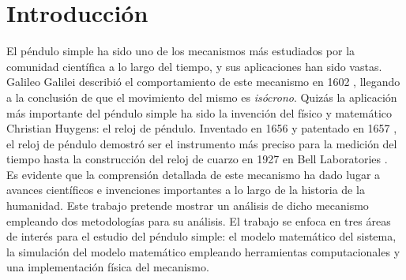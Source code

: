 \section{Introducción}

El péndulo simple ha sido uno de los mecanismos más estudiados 
por la comunidad científica a lo largo del tiempo, 
y sus aplicaciones han sido vastas. 
Galileo Galilei describió el comportamiento de
este mecanismo en 1602 \cite{drake2003galileo}, 
llegando a la conclusión de que el movimiento del mismo es 
\emph{isócrono}.
Quizás la aplicación más importante del péndulo simple ha sido
la invención del físico y matemático Christian Huygens: el reloj
de péndulo.
Inventado en 1656 y patentado en 1657 \cite{bennet2002huygenclock}, 
el reloj de péndulo demostró ser el instrumento más preciso para
la medición del tiempo hasta la construcción del reloj de
cuarzo en 1927 en Bell Laboratories \cite{morrison1948quartzcrystalclock}.\\

Es evidente que la comprensión detallada de este mecanismo
ha dado lugar a avances científicos e invenciones importantes 
a lo largo de la historia de la humanidad.
Este trabajo pretende mostrar un análisis de dicho mecanismo
empleando dos metodologías para su análisis.
El trabajo se enfoca en tres áreas de interés para el estudio
del péndulo simple: el modelo matemático del sistema, 
la simulación del modelo matemático empleando 
herramientas computacionales y una implementación
física del mecanismo.
